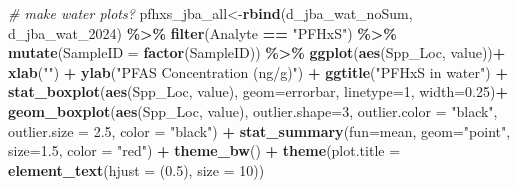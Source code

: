 \documentclass[
]{article}
\newenvironment{Shaded}{\begin{snugshade}}{\end{snugshade}}
\newcommand{\AttributeTok}[1]{\textcolor[rgb]{0.13,0.29,0.53}{#1}}
\newcommand{\CommentTok}[1]{\textcolor[rgb]{0.56,0.35,0.01}{\textit{#1}}}
\newcommand{\DecValTok}[1]{\textcolor[rgb]{0.00,0.00,0.81}{#1}}
\newcommand{\FloatTok}[1]{\textcolor[rgb]{0.00,0.00,0.81}{#1}}
\newcommand{\FunctionTok}[1]{\textcolor[rgb]{0.13,0.29,0.53}{\textbf{#1}}}
\newcommand{\NormalTok}[1]{#1}
\newcommand{\OtherTok}[1]{\textcolor[rgb]{0.56,0.35,0.01}{#1}}
\newcommand{\SpecialCharTok}[1]{\textcolor[rgb]{0.81,0.36,0.00}{\textbf{#1}}}
\newcommand{\StringTok}[1]{\textcolor[rgb]{0.31,0.60,0.02}{#1}}
\begin{document}
\begin{Shaded}
\begin{Highlighting}[]
\CommentTok{\# make water plots?}
\NormalTok{pfhxs\_jba\_all}\OtherTok{\textless{}{-}}\FunctionTok{rbind}\NormalTok{(d\_jba\_wat\_noSum, d\_jba\_wat\_2024) }\SpecialCharTok{\%\textgreater{}\%} 
  \FunctionTok{filter}\NormalTok{(Analyte }\SpecialCharTok{==} \StringTok{"PFHxS"}\NormalTok{) }\SpecialCharTok{\%\textgreater{}\%} 
  \FunctionTok{mutate}\NormalTok{(}\AttributeTok{SampleID =} \FunctionTok{factor}\NormalTok{(SampleID)) }\SpecialCharTok{\%\textgreater{}\%} 
  \FunctionTok{ggplot}\NormalTok{(}\FunctionTok{aes}\NormalTok{(Spp\_Loc, value))}\SpecialCharTok{+}
    \FunctionTok{xlab}\NormalTok{(}\StringTok{""}\NormalTok{) }\SpecialCharTok{+}
    \FunctionTok{ylab}\NormalTok{(}\StringTok{"PFAS Concentration (ng/g)"}\NormalTok{) }\SpecialCharTok{+}
    \FunctionTok{ggtitle}\NormalTok{(}\StringTok{"PFHxS in water"}\NormalTok{) }\SpecialCharTok{+}
    \FunctionTok{stat\_boxplot}\NormalTok{(}\FunctionTok{aes}\NormalTok{(Spp\_Loc, value),}
                 \AttributeTok{geom=}\StringTok{\textquotesingle{}errorbar\textquotesingle{}}\NormalTok{, }\AttributeTok{linetype=}\DecValTok{1}\NormalTok{, }\AttributeTok{width=}\FloatTok{0.25}\NormalTok{)}\SpecialCharTok{+}
    \FunctionTok{geom\_boxplot}\NormalTok{(}\FunctionTok{aes}\NormalTok{(Spp\_Loc, value),}
                 \AttributeTok{outlier.shape=}\DecValTok{3}\NormalTok{,}
                 \AttributeTok{outlier.color =} \StringTok{"black"}\NormalTok{,}
                 \AttributeTok{outlier.size =} \FloatTok{2.5}\NormalTok{,}
                 \AttributeTok{color =} \StringTok{"black"}\NormalTok{) }\SpecialCharTok{+} 
    \FunctionTok{stat\_summary}\NormalTok{(}\AttributeTok{fun=}\NormalTok{mean, }\AttributeTok{geom=}\StringTok{"point"}\NormalTok{, }\AttributeTok{size=}\FloatTok{1.5}\NormalTok{, }\AttributeTok{color =} \StringTok{"red"}\NormalTok{) }\SpecialCharTok{+}
    \FunctionTok{theme\_bw}\NormalTok{() }\SpecialCharTok{+}
    \FunctionTok{theme}\NormalTok{(}\AttributeTok{plot.title =} \FunctionTok{element\_text}\NormalTok{(}\AttributeTok{hjust =}\NormalTok{ (}\FloatTok{0.5}\NormalTok{), }\AttributeTok{size =} \DecValTok{10}\NormalTok{))}


\end{Highlighting}
\end{Shaded}
\end{document}
